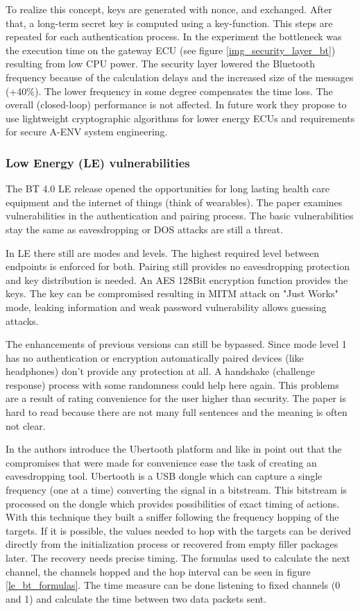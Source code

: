 \documentclass[12pt,a4paper]{article}
\begin{document}
To realize this concept, keys are generated with nonce, and exchanged. After that, a long-term secret key is computed using a key-function. This steps are repeated for each authentication process. In the experiment the bottleneck was the execution time on the gateway ECU (see figure \ref{img_security_layer_bt}) resulting from low CPU power. The security layer lowered the Bluetooth frequency because of the calculation delays and the increased size of the messages (+40\%). The lower frequency in some degree compensates the time loss. The overall (closed-loop) performance is not affected. In future work they propose to use lightweight cryptographic algorithms for lower energy ECUs and requirements for secure A-ENV system engineering.

\subsubsection{Low Energy (LE) vulnerabilities}
The BT 4.0 LE release opened the opportunities for long lasting health care equipment and the internet of things (think of wearables). The paper \cite{DBLP:conf/greencom/XuZLMLCSTY13} examines vulnerabilities in the authentication and pairing process. The basic vulnerabilities stay the same as eavesdropping or DOS attacks are still a threat.

In LE there still are modes and levels. The highest required level between endpoints is enforced for both. Pairing still provides no eavesdropping protection and key distribution is needed. An AES 128Bit encryption function provides the keys. The key can be compromised resulting in MITM attack on "Just Works" mode, leaking information and weak password vulnerability allows guessing attacks.

The enhancements of previous versions can still be bypassed. Since mode level 1 has no authentication or encryption automatically paired devices (like headphones) don't provide any protection at all. A handshake (challenge response) process with some randomness could help here again. This problems are a result of rating convenience for the user higher than security.
The paper is hard to read because there are not many full sentences and the meaning is often not clear.

In \cite{DBLP:conf/woot/Ryan13} the authors introduce the Ubertooth platform and like in \cite{DBLP:conf/greencom/XuZLMLCSTY13} point out that the compromises that were made for convenience ease the task of creating an eavesdropping tool. Ubertooth is a USB dongle which can capture a single frequency (one at a time) converting the signal in a bitstream. This bitstream is processed on the dongle which provides possibilities of exact timing of actions. With this technique they built a sniffer following the frequency hopping of the targets. If it is possible, the values needed to hop with the targets can be derived directly from the initialization process or recovered from empty filler packages later. The recovery needs precise timing. The formulas used to calculate the next channel, the channels hopped and the hop interval can be seen in figure \ref{le_bt_formulas}. The time measure can be done listening to fixed channels (0 and 1) and calculate the time between two data packets sent.
\end{document}
